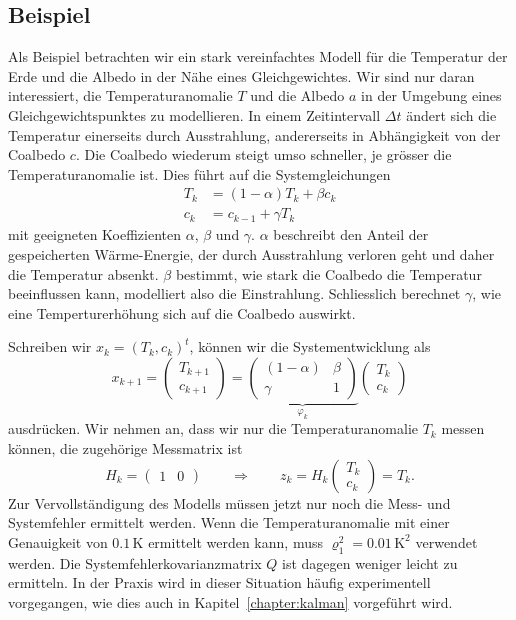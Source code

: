 \subsection{Beispiel}
Als Beispiel betrachten wir ein stark vereinfachtes Modell für die
Temperatur der Erde und die Albedo in der Nähe eines Gleichgewichtes.
Wir sind nur daran interessiert, die Temperaturanomalie $T$ und die
Albedo $a$ in der Umgebung eines Gleichgewichtspunktes zu
modellieren.
In einem Zeitintervall $\Delta t$ ändert sich die Temperatur
einerseits durch Ausstrahlung, andererseits in Abhängigkeit von
der Coalbedo $c$. 
Die Coalbedo wiederum steigt umso schneller, je grösser die
Temperaturanomalie ist.
Dies führt auf die Systemgleichungen
\[
\begin{aligned}
T_k &= (1-\alpha) T_k  + \beta c_k \\
c_k &= c_{k-1} + \gamma T_k
\end{aligned}
\]
mit geeigneten Koeffizienten $\alpha$, $\beta$ und $\gamma$.
$\alpha$ beschreibt den Anteil der gespeicherten Wärme-Energie, der durch
Ausstrahlung verloren geht und daher die Temperatur absenkt.
$\beta$ bestimmt, wie stark die Coalbedo die Temperatur beeinflussen kann,
modelliert also die Einstrahlung.
Schliesslich berechnet $\gamma$, wie eine Temperturerhöhung sich auf die
Coalbedo auswirkt.

Schreiben wir $x_k=(T_k,c_k)^t$, können wir die Systementwicklung als
\[
x_{k+1}
=
\begin{pmatrix}
T_{k+1}\\c_{k+1}
\end{pmatrix}
=
\underbrace{
\begin{pmatrix}
(1-\alpha)&\beta\\
\gamma& 1
\end{pmatrix}}_{\displaystyle\varphi_k}
\begin{pmatrix}
T_k\\c_k
\end{pmatrix}
\]
ausdrücken.
Wir nehmen an, dass wir nur die Temperaturanomalie $T_k$ messen können,
die zugehörige Messmatrix ist
\[
H_k=\begin{pmatrix}1&0\end{pmatrix}
\qquad\Rightarrow\qquad
z_k = H_k\begin{pmatrix} T_k\\c_k\end{pmatrix}
=
T_k.
\]
Zur Vervollständigung des Modells müssen jetzt nur noch die Mess- und
Systemfehler ermittelt werden.
Wenn die Temperaturanomalie mit einer Genauigkeit von $0.1\,\text{K}$
ermittelt werden kann, muss $\varrho_1^2=0.01\,\text{K}^2$ verwendet
werden.
Die Systemfehlerkovarianzmatrix $Q$ ist dagegen weniger leicht zu ermitteln.
In der Praxis wird in dieser Situation häufig experimentell vorgegangen,
wie dies auch in Kapitel~\ref{chapter:kalman} vorgeführt wird.






